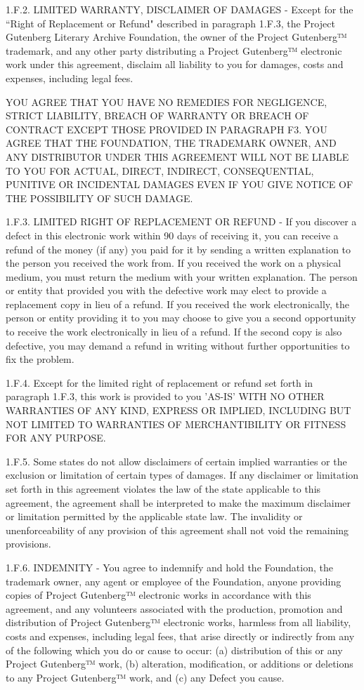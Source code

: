 {1.F.2. LIMITED WARRANTY, DISCLAIMER OF DAMAGES - Except for the “Right
of Replacement or Refund" described in paragraph 1.F.3, the Project
Gutenberg Literary Archive Foundation, the owner of the Project
Gutenberg™ trademark, and any other party distributing a Project
Gutenberg™ electronic work under this agreement, disclaim all
liability to you for damages, costs and expenses, including legal
fees. 

YOU AGREE THAT YOU HAVE NO REMEDIES FOR NEGLIGENCE, STRICT
LIABILITY, BREACH OF WARRANTY OR BREACH OF CONTRACT EXCEPT THOSE
PROVIDED IN PARAGRAPH F3. YOU AGREE THAT THE FOUNDATION, THE
TRADEMARK OWNER, AND ANY DISTRIBUTOR UNDER THIS AGREEMENT WILL NOT BE
LIABLE TO YOU FOR ACTUAL, DIRECT, INDIRECT, CONSEQUENTIAL, PUNITIVE OR
INCIDENTAL DAMAGES EVEN IF YOU GIVE NOTICE OF THE POSSIBILITY OF SUCH
DAMAGE.

1.F.3. LIMITED RIGHT OF REPLACEMENT OR REFUND - If you discover a
defect in this electronic work within 90 days of receiving it, you can
receive a refund of the money (if any) you paid for it by sending a
written explanation to the person you received the work from. If you
received the work on a physical medium, you must return the medium with
your written explanation. The person or entity that provided you with
the defective work may elect to provide a replacement copy in lieu of a
refund. If you received the work electronically, the person or entity
providing it to you may choose to give you a second opportunity to
receive the work electronically in lieu of a refund. If the second copy
is also defective, you may demand a refund in writing without further
opportunities to fix the problem.

1.F.4. Except for the limited right of replacement or refund set forth
in paragraph 1.F.3, this work is provided to you 'AS-IS' WITH NO OTHER
WARRANTIES OF ANY KIND, EXPRESS OR IMPLIED, INCLUDING BUT NOT LIMITED TO
WARRANTIES OF MERCHANTIBILITY OR FITNESS FOR ANY PURPOSE.

1.F.5. Some states do not allow disclaimers of certain implied
warranties or the exclusion or limitation of certain types of damages.
If any disclaimer or limitation set forth in this agreement violates the
law of the state applicable to this agreement, the agreement shall be
interpreted to make the maximum disclaimer or limitation permitted by
the applicable state law. The invalidity or unenforceability of any
provision of this agreement shall not void the remaining provisions.

1.F.6. INDEMNITY - You agree to indemnify and hold the Foundation, the
trademark owner, any agent or employee of the Foundation, anyone
providing copies of Project Gutenberg™ electronic works in accordance
with this agreement, and any volunteers associated with the production,
promotion and distribution of Project Gutenberg™ electronic works,
harmless from all liability, costs and expenses, including legal fees,
that arise directly or indirectly from any of the following which you do
or cause to occur: (a) distribution of this or any Project Gutenberg™
work, (b) alteration, modification, or additions or deletions to any
Project Gutenberg™ work, and (c) any Defect you cause.

}
